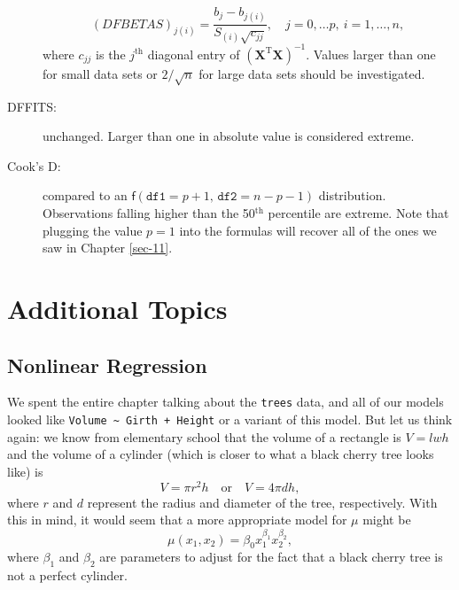 \begin{description}
\begin{equation}
(DFBETAS)_{j(i)}=\frac{b_{j}-b_{j(i)}}{S_{(i)}\sqrt{c_{jj}}},\quad j=0,\ldots p,\ i=1,\ldots,n,
\end{equation}
where \(c_{jj}\) is the \(j^{\mathrm{th}}\) diagonal entry of
\((\mathbf{X}^{\mathrm{T}}\mathbf{X})^{-1}\). Values
larger than one for small data sets or \(2/\sqrt{n}\)
for large data sets should be investigated.
\item[{DFFITS:}] unchanged. Larger than one in absolute value is
considered extreme.
\item[{Cook's D:}] compared to an \(\mathsf{f}(\mathtt{df1} = p +
               1,\,\mathtt{df2} = n - p - 1)\)
distribution. Observations falling higher than the
50\(^{\textrm{th}}\) percentile are extreme.  Note that
plugging the value \(p=1\) into the formulas will
recover all of the ones we saw in Chapter
\ref{sec-11}.
\end{description}

\section{Additional Topics}
\label{sec-12-7}

\subsection{Nonlinear Regression}
\label{sec-12-7-1}

We spent the entire chapter talking about the \texttt{trees} data, and all of
our models looked like \texttt{Volume \textasciitilde{} Girth + Height} or a variant of this
model. But let us think again: we know from elementary school that the
volume of a rectangle is \(V=lwh\) and the volume of a cylinder (which
is closer to what a black cherry tree looks like) is
\begin{equation}
V=\pi r^{2}h\quad \mbox{or}\quad V=4\pi dh,
\end{equation}
where \(r\) and \(d\) represent the radius and diameter of the tree,
respectively. With this in mind, it would seem that a more appropriate
model for \(\mu\) might be
\begin{equation}
\label{eq-trees-nonlin-reg}
\mu(x_{1},x_{2})=\beta_{0}x_{1}^{\beta_{1}}x_{2}^{\beta_{2}},
\end{equation}
where \(\beta_{1}\) and \(\beta_{2}\) are parameters to adjust for the
fact that a black cherry tree is not a perfect cylinder.

